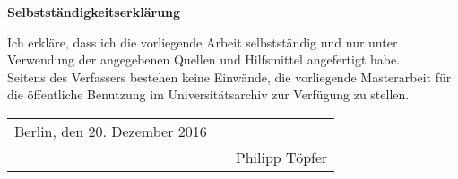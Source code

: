 \pagestyle{empty}
\begin{center}
{\bf\Large Selbstständigkeitserklärung}\\
\end{center}%
\vspace{1cm}
%
Ich erkläre, dass ich die vorliegende Arbeit selbstständig und nur unter Verwendung der angegebenen Quellen und Hilfsmittel angefertigt habe.\\[0.2cm]
\noindent Seitens des Verfassers bestehen keine Einwände, die vorliegende Masterarbeit für die öffentliche Benutzung im Universitätsarchiv zur Verfügung zu stellen.\\[2cm]

\hspace{-1cm}
\begin{tabular}{p{5.5cm}p{2.5cm}c}
Berlin, den 20. Dezember 2016   && \hrulefill\\%
     && \hspace{1cm}Philipp Töpfer \hspace{1cm}
\end{tabular} 